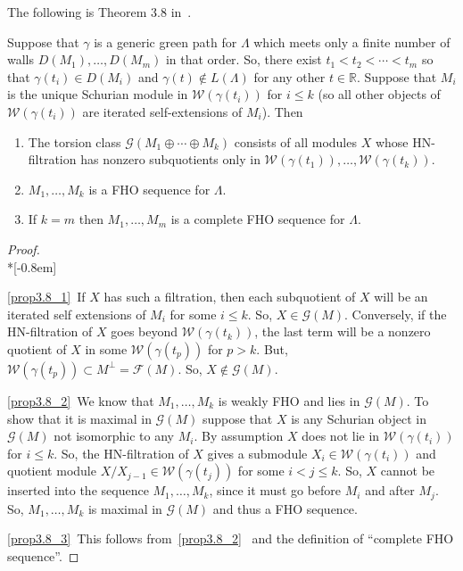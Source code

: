 \documentclass[ALCO,ThmDefs,Unicode,epreuves]{cedram}
\newcommand{\field}[1]{\mathbb{#1}}
\newcommand{\RR}{\ensuremath{{\field{R}}}}
\newcommand{\cF}{\ensuremath{{\mathcal{F}}}}
\newcommand{\cG}{\ensuremath{{\mathcal{G}}}}
\newcommand{\cW}{\ensuremath{{\mathcal{W}}}}
\begin{document}
The following is Theorem 3.8 in~\cite{PartI}.

\begin{prop}\label{prop: wall sequence is hom orthog}
Suppose that $\gamma$ is a generic green path for $\Lambda$ which meets only a finite number of walls $D(M_1),\ldots,D(M_m)$ in that order. So, there exist $t_1<t_2<\cdots<t_m$ so that $\gamma(t_i)\in D(M_i)$ and $\gamma(t)\notin L(\Lambda)$ for any other $t\in\RR$. Suppose that $M_i$ is the unique Schurian module in $\cW(\gamma(t_i))$ for $i\le k$ (so all other objects of $\cW(\gamma(t_i))$ are iterated self-extensions of $M_i$). Then 
\begin{enumerate}
\item\label{prop3.8_1} The torsion class $\cG(M_1\oplus\cdots\oplus M_k)$ consists of all modules $X$ whose HN-filtration has nonzero subquotients only in $\cW(\gamma(t_1)),\ldots,\cW(\gamma(t_k))$.
\item\label{prop3.8_2} $M_1,\ldots, M_k$ is a FHO sequence for $\Lambda$. 
\item\label{prop3.8_3}
If $k=m$ then $M_1,\ldots,M_m$ is a complete FHO sequence for $\Lambda$.
\end{enumerate}
\end{prop}

\begin{proof} \ \\*[-0.8em]

\eqref{prop3.8_1}~If $X$ has such a filtration, then each subquotient of $X$ will be an iterated self extensions of $M_i$ for some $i\le k$. So, $X\in\cG(M)$. Conversely, if the HN-filtration of $X$ goes beyond $\cW(\gamma(t_k))$, the last term will be a nonzero quotient of $X$ in some $\cW(\gamma(t_p))$ for $p>k$. But, $\cW(\gamma(t_p))\subset M^\perp=\cF(M)$. So, $X\notin \cG(M)$.

\eqref{prop3.8_2}~We know that $M_1,\ldots,M_k$ is weakly FHO and lies in $\cG(M)$. To show that it is maximal in $\cG(M)$ suppose that $X$ is any Schurian object in $\cG(M)$ not isomorphic to any $M_i$. By assumption $X$ does not lie in $\cW(\gamma(t_i))$ for $i\le k$. So, the HN-filtration of $X$ gives a submodule $X_i\in\cW(\gamma(t_i))$ and quotient module $X/X_{j-1}\in \cW(\gamma(t_j))$ for some $i<j\le k$. So, $X$ cannot be inserted into the sequence $M_1,\ldots,M_k$, since it must go before $M_i$ and after $M_j$. So, $M_1,\ldots,M_k$ is maximal in $\cG(M)$ and thus a FHO sequence.

\eqref{prop3.8_3}~This follows from~\eqref{prop3.8_2}~ and the definition of ``complete FHO sequence''.
\end{proof}
\end{document}
